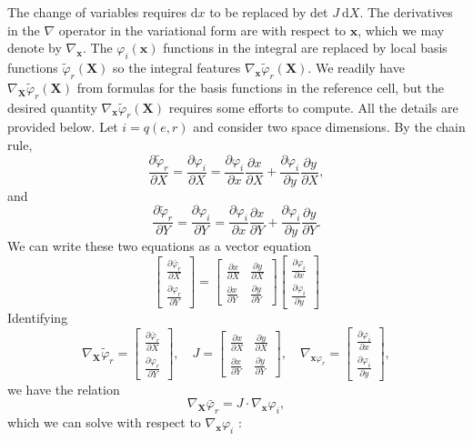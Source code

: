 \documentclass[../main.tex]{subfiles}
\begin{document}
		The change of variables requires $\mathrm{d} x$ to be replaced by det $J \mathrm{~d} X$. The derivatives in the $\nabla$ operator in the variational form are with respect to $\boldsymbol{x}$, which we may denote by $\nabla_{\boldsymbol{x}}$. The $\varphi_{i}(\boldsymbol{x})$ functions in the integral are replaced by local basis functions $\tilde{\varphi}_{r}(\boldsymbol{X})$ so the integral features $\nabla_{\boldsymbol{x}} \tilde{\varphi}_{r}(\boldsymbol{X})$. We readily have
		$\nabla_{\boldsymbol{X}} \tilde{\varphi}_{r}(\boldsymbol{X})$ from formulas for the basis functions in the reference cell, but the desired quantity $\nabla_{\boldsymbol{x}} \tilde{\varphi}_{r}(\boldsymbol{X})$ requires some efforts to compute. All the details are provided below.\smallbreak
		Let $i=q(e, r)$ and consider two space dimensions. By the chain rule,
		$$
		\frac{\partial \tilde{\varphi}_{r}}{\partial X}=\frac{\partial \varphi_{i}}{\partial X}=\frac{\partial \varphi_{i}}{\partial x} \frac{\partial x}{\partial X}+\frac{\partial \varphi_{i}}{\partial y} \frac{\partial y}{\partial X},
		$$
		and
		$$
		\frac{\partial \tilde{\varphi}_{r}}{\partial Y}=\frac{\partial \varphi_{i}}{\partial Y}=\frac{\partial \varphi_{i}}{\partial x} \frac{\partial x}{\partial Y}+\frac{\partial \varphi_{i}}{\partial y} \frac{\partial y}{\partial Y} .
		$$
		We can write these two equations as a vector equation
		$$
		\left[\begin{array}{l}
			\frac{\partial \bar{\varphi}_{r}}{\partial X} \\
			\frac{\partial \varphi_{r}}{\partial Y}
		\end{array}\right]=\left[\begin{array}{ll}
			\frac{\partial x}{\partial X} & \frac{\partial y}{\partial X} \\
			\frac{\partial x}{\partial Y} & \frac{\partial y}{\partial Y}
		\end{array}\right]\left[\begin{array}{l}
			\frac{\partial \varphi_{i}}{\partial x} \\
			\frac{\partial \varphi_{i}}{\partial y}
		\end{array}\right]
		$$
		Identifying
		$$
		\nabla_{\boldsymbol{X}} \tilde{\varphi}_{r}=\left[\begin{array}{l}
			\frac{\partial \bar{\varphi}_{r}}{\partial X} \\
			\frac{\partial \varphi_{r}}{\partial Y}
		\end{array}\right], \quad J=\left[\begin{array}{ll}
			\frac{\partial x}{\partial X} & \frac{\partial y}{\partial X} \\
			\frac{\partial x}{\partial Y} & \frac{\partial y}{\partial Y}
		\end{array}\right], \quad \nabla_{\boldsymbol{x} \varphi_{r}}=\left[\begin{array}{c}
			\frac{\partial \varphi_{i}}{\partial x} \\
			\frac{\partial \varphi_{i}}{\partial y}
		\end{array}\right],
		$$
		we have the relation
		$$
		\nabla_{\boldsymbol{X}} \bar{\varphi}_{r}=J \cdot \nabla_{\boldsymbol{x}} \varphi_{i},
		$$
		which we can solve with respect to $\nabla_{\boldsymbol{x}} \varphi_{i}$ :
		
\end{document}
